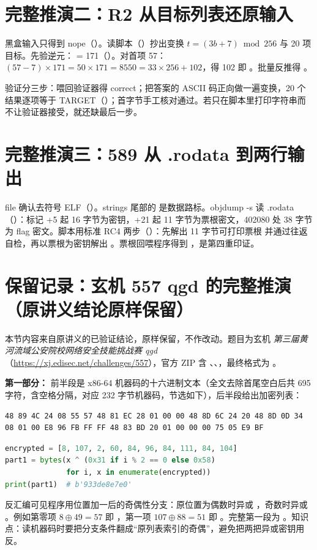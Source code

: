 \documentclass[UTF8,12pt,oneside]{ctexbook}
\begin{document}
\section{完整推演二：R2 从目标列表还原输入}
黑盒输入只得到 nope（）。读脚本（）抄出变换 $t=(3b+7)\bmod256$ 与 20 项目标。先验逆元： = 171（）。对首项 57：$(57-7)\times171 = 50\times171 = 8550 = 33\times256 + 102$，得 102 即 。批量反推得 。

验证分三步：喂回验证器得 correct；把答案的 ASCII 码正向做一遍变换，20 个结果逐项等于 TARGET（）；首字节手工核对通过。若只在脚本里打印字符串而不让验证器接受，就还缺最后一步。

\section{完整推演三：589 从 .rodata 到两行输出}
file 确认去符号 ELF（）。strings 尾部的  是数据路标。objdump -s 读 .rodata（）：标记 +5 起 16 字节为密钥，+21 起 11 字节为票根密文，402080 处 38 字节为 flag 密文。脚本用标准 RC4 两步（）：先解出 11 字节可打印票根  并通过往返自检，再以票根为密钥解出 。票根回喂程序得到 ，是第四重印证。

\section{保留记录：玄机 557 qgd 的完整推演（原讲义结论原样保留）}
本节内容来自原讲义的已验证结论，原样保留，不作改动。题目为玄机 \emph{第三届黄河流域公安院校网络安全技能挑战赛 qgd}（\url{https://xj.edisec.net/challenges/557}），官方 ZIP 含 、、，最终格式为 。

\textbf{第一部分：} 前半段是 x86-64 机器码的十六进制文本（全文去除首尾空白后共 695 字符，含空格分隔，对应 232 字节机器码，节选如下），后半段给出加密列表：
\begin{lstlisting}
48 89 4C 24 08 55 57 48 81 EC 28 01 00 00 48 8D 6C 24 20 48 8D 0D 34 08 01 00 E8 96 FB FF FF 48 83 BD 20 01 00 00 00 75 05 E9 BF
\end{lstlisting}
\begin{lstlisting}[language=Python]
encrypted = [8, 107, 2, 60, 84, 96, 84, 111, 84, 104]
part1 = bytes(x ^ (0x31 if i % 2 == 0 else 0x58)
              for i, x in enumerate(encrypted))
print(part1)  # b'933de8e7e0'
\end{lstlisting}
反汇编可见程序用位置加一后的奇偶性分支：原位置为偶数时异或 ，奇数时异或 。例如第零项 $8\oplus49=57$ 即 ，第一项 $107\oplus88=51$ 即 。完整第一段为 。知识点：读机器码时要把分支条件翻成“原列表索引的奇偶”，避免把两把异或密钥用反。
\end{document}
